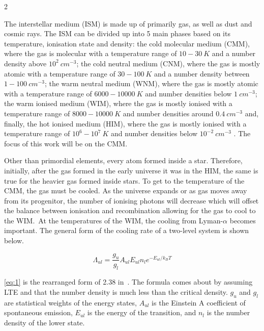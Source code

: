 \documentclass[a4paper,11pt]{article}
\begin{document}
\begin{multicols}{2}
\par\noindent The interstellar medium (ISM) is made up of primarily gas, as well as dust and cosmic rays. The ISM can be divided up into 5 main phases based on its temperature, ionisation state and density: the cold molecular medium (CMM), where the gas is molecular with a temperature range of ${10} - {30}\ K$ and a number density above ${10}^{2}\ c{m}^{-3}$; the cold neutral medium (CNM), where the gas is mostly atomic with a temperature range of ${30} - {100}\ K$ and a number density between ${1} - {100}\ c{m}^{-3}$; the warm neutral medium (WNM), where the gas is mostly atomic with a temperature range of ${6000} - {10000}\ K$ and number densities below ${1}\ c{m}^{-3}$; the warm ionised medium (WIM), where the gas is mostly ionised with a temperature range of ${8000} - {10000}\ K$ and number densities around ${0.4}\ c{m}^{-3}$ and, finally, the hot ionised medium (HIM), where the gas is mostly ionised with a temperature range of ${10}^{6} - {10}^{7}\ K$ and number densities below ${10}^{-2}\ c{m}^{-3}$ \parencite[see][]{ISM}. The focus of this work will be on the CMM.\
\smallskip
\par\noindent Other than primordial elements, every atom formed inside a star. Therefore, initially, after the gas formed in the early universe it was in the HIM, the same is true for the heavier gas formed inside stars. To get to the temperature of the CMM, the gas must be cooled. As the universe expands or as gas moves away from its progenitor, the number of ionising photons will decrease which will offset the balance between ionisation and recombination allowing for the gas to cool to the WIM.\ At the temperatures of the WIM, the cooling from Lyman-$\alpha$ becomes important. The general form of the cooling rate of a two-level system is shown below. 

\begin{equation}
    \Lambda_{ul} = \dfrac{g_u}{g_l}A_{ul}E_{ul}n_{l}e^{-E_{ul}/k_{B}T}\label{eq:1}
    \tag{1}
\end{equation}

\par\noindent \autoref{eq:1} is the rearranged form of 2.38 in\ \cite{Chemistry}. The formula comes about by assuming LTE and that the number density is much less than the critical density. $g_u$ and $g_l$ are statistical weights of the energy states, $A_{ul}$ is the Einstein A coefficient of spontaneous emission, $E_{ul}$ is the energy of the transition, and $n_{l}$ is the number density of the lower state. 


\end{multicols}
\end{document}
